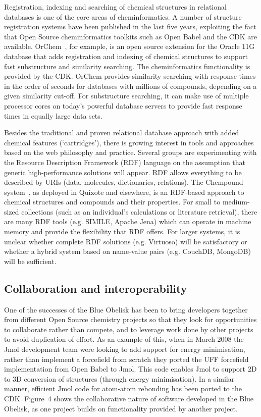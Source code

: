 \documentclass[10pt]{bmc_article}
\newenvironment{bmcformat}{\begin{raggedright}\baselineskip20pt\sloppy\setboolean{publ}{false}}{\end{raggedright}\baselineskip20pt\sloppy}
\begin{document}
\begin{bmcformat}
Registration, indexing and searching of chemical structures in
relational databases is one of the core areas of cheminformatics.
A number of structure registration systems have been published in the last five years, exploiting the fact that
Open Source cheminformatics toolkits such as Open Babel and the CDK
are available.
OrChem~\cite{RijnbeekS10}, for example, is an open source extension for the Oracle 11G database that
adds registration and indexing of chemical structures to support fast
substructure and similarity searching. The cheminformatics
functionality is provided by the CDK. OrChem
provides similarity searching with response times in the order of
seconds for databases with millions of compounds, depending on a given
similarity cut-off. For substructure searching, it can make use of
multiple processor cores on today's powerful database servers to
provide fast response times in equally large data sets.

Besides the traditional and proven relational database approach with
added chemical features (`cartridges'), there is growing
interest in tools and approaches based on the web philosophy and
practice. Several groups are experimenting with 
the Resource Description Framework (RDF) language
on the assumption that generic high-performance solutions will appear.
RDF allows everything to be described by
URIs (data, molecules, dictionaries, relations). The Chempound
system~\cite{Chempound},
as deployed in
Quixote and elsewhere, is an RDF-based approach to chemical structures
and compounds and their properties. For small
to medium-sized collections (such as an individual's calculations or
literature retrieval), there are many RDF tools
(e.g. SIMILE, Apache Jena) which can operate in machine memory and provide
the flexibility that RDF offers. For larger
systems, it is unclear whether complete RDF solutions (e.g. Virtuoso)
will be satisfactory or whether a hybrid system
based on name-value pairs (e.g. CouchDB, MongoDB) will be sufficient.

  \subsection*{Collaboration and interoperability}

One of the successes of the Blue Obelisk has been to bring developers
together from different Open Source chemistry projects so that they
look for opportunities to collaborate rather than compete, and to
leverage work done by other projects to avoid duplication of effort.
As an example of this, when in March 2008 the Jmol development team
were looking to add support for energy minimisation, rather than
implement a forcefield from scratch they ported the UFF forcefield~\cite{Rappe:1992um}
implementation from Open Babel to Jmol. This code enables Jmol to
support 2D to 3D conversion of structures (through energy
minimisation). In a similar manner, efficient Jmol code for atom-atom rebonding
has been ported to the CDK. Figure~4 shows the collaborative nature of
software developed in the Blue Obelisk, as one project builds on
functionality provided by another project.


\end{bmcformat}
\end{document}
